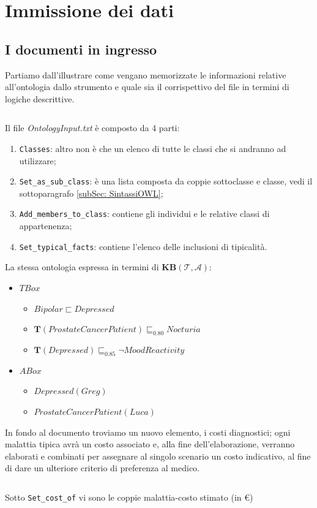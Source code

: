 \section{Immissione dei dati}
\subsection{I documenti in ingresso}
Partiamo dall'illustrare come vengano memorizzate le informazioni relative all'ontologia dallo strumento 
e quale sia il corrispettivo del file in termini di logiche descrittive. 
\inputminted[lastline=11]{text}{codice/ExOntoInput.txt}
Il file \emph{OntologyInput.txt} è composto da 4 parti:
\begin{enumerate}
	\item \texttt{Classes}: altro non è che un elenco di tutte le classi che si andranno ad utilizzare;
	\item \texttt{Set_as_sub_class}: è una lista composta da coppie sottoclasse e classe, vedi il sottoparagrafo \ref{subSec: SintassiOWL};
	\item \texttt{Add_members_to_class}: contiene gli individui e le relative classi di appartenenza; 
	\item \texttt{Set_typical_facts}: contiene l'elenco delle inclusioni di tipicalità.
\end{enumerate}

La stessa ontologia espressa in termini di \textbf{KB}$ (\mathcal{T}, \mathcal{A}) $:
\begin{itemize}
	\item $TBox$ 
		\begin{itemize}
			\item $ Bipolar \sqsubset Depressed $
			\item $ \mathbf T(ProstateCancerPatient) \sqsubseteq_{0.80} Nocturia $
			\item $ \mathbf T(Depressed) \sqsubseteq_{0.85} \neg MoodReactivity $
		\end{itemize}
	\item $ABox$ 
		\begin{itemize}
			\item $ Depressed(Greg) $
			\item $ ProstateCancerPatient(Luca) $
		\end{itemize}
\end{itemize}

In fondo al documento troviamo un nuovo elemento, i costi diagnostici; ogni malattia tipica avrà
un costo associato e, alla fine dell'elaborazione, verranno elaborati e combinati per assegnare al singolo
scenario un costo indicativo, al fine di dare un ulteriore criterio di preferenza al medico.
\inputminted[firstline=13]{text}{codice/ExOntoInput.txt}
Sotto \texttt{Set_cost_of} vi sono le coppie malattia-costo stimato (in €)

